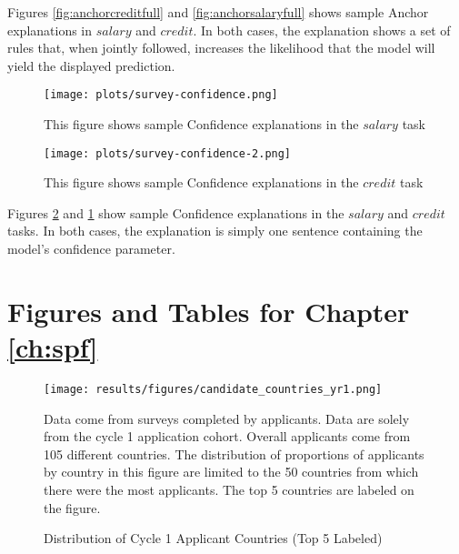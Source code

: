Figures \ref{fig:anchorcreditfull} and \ref{fig:anchorsalaryfull} shows sample Anchor explanations in $salary$ and $credit$. In both cases, the explanation shows a set of rules that, when jointly followed, increases the likelihood that the model will yield the displayed prediction.

\begin{figure}[htbp]
    \centering
    \texttt{[image: plots/survey-confidence.png]}
    \caption{This figure shows sample Confidence explanations in the $salary$ task}
    \label{fig:confidencesalaryfull}
\end{figure}

\begin{figure}[hbtp]
    \centering
    \texttt{[image: plots/survey-confidence-2.png]}
    \caption{This figure shows sample Confidence explanations in the $credit$ task}
    \label{fig:confidencecreditfull}
\end{figure}

Figures \ref{fig:confidencecreditfull} and \ref{fig:confidencesalaryfull} show sample Confidence explanations in the $salary$ and $credit$ tasks. In both cases, the explanation is simply one sentence containing the model's confidence parameter.


\section{Figures and Tables for Chapter \ref{ch:spf}}
\begin{landscape}
    \begin{figure}[!htb]
    \centering
        \caption{Distribution of Cycle 1 Applicant Countries (Top 5 Labeled) }\label{fig:dist_countryies_c1}
      \texttt{[image: results/figures/candidate\_countries\_yr1.png]} 
        \begin{notes}
        Data come from surveys completed by applicants. Data are solely from the cycle 1 application cohort. Overall applicants come from 105 different countries. The distribution of proportions of applicants by country in this figure are limited to the 50 countries from which there were the most applicants. The top 5 countries are labeled on the figure. 
        \end{notes}
    \end{figure}
    \end{landscape}
    
